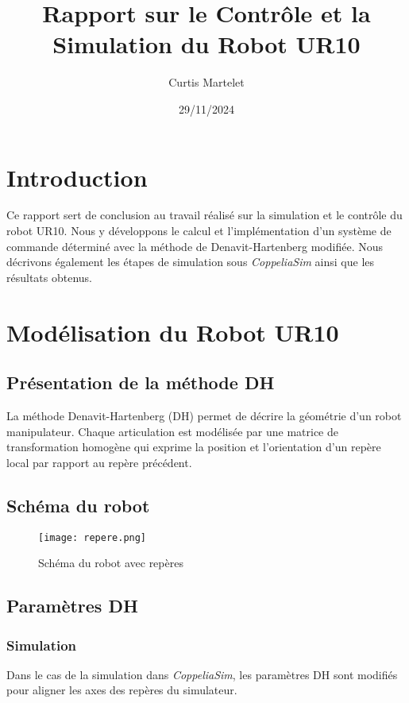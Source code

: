 \documentclass[a4paper,12pt]{article}
\title{Rapport sur le Contrôle et la Simulation du Robot UR10}
\author{Curtis Martelet}
\date{29/11/2024}
\begin{document}
\maketitle
\tableofcontents
\newpage

\section{Introduction}
Ce rapport sert de conclusion au travail réalisé sur la simulation et le contrôle du robot UR10.  
Nous y développons le calcul et l'implémentation d'un système de commande déterminé avec la méthode de Denavit-Hartenberg modifiée.  
Nous décrivons également les étapes de simulation sous \textit{CoppeliaSim} ainsi que les résultats obtenus.  

\section{Modélisation du Robot UR10}
\subsection{Présentation de la méthode DH}
La méthode Denavit-Hartenberg (DH) permet de décrire la géométrie d'un robot manipulateur.  
Chaque articulation est modélisée par une matrice de transformation homogène qui exprime la position et l'orientation d'un repère local par rapport au repère précédent.  

\subsection{Schéma du robot}
\begin{figure}[h!]
    \centering
    \texttt{[image: repere.png]}
    \caption{Schéma du robot avec repères}
\end{figure}

\subsection{Paramètres DH}
\subsubsection{Simulation}
Dans le cas de la simulation dans \textit{CoppeliaSim}, les paramètres DH sont modifiés pour aligner les axes des repères du simulateur.  
\end{document}
